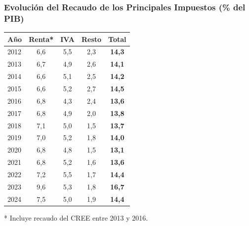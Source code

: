 
\begin{frame}[fragile]
  \frametitle{Evolución del Recaudo de los Principales Impuestos (\% del PIB)}

  \begin{table}
  \centering
  \begin{tabular}{|l|c|c|c|c|}
  \hline
  \textbf{Año} & \textbf{Renta*} & \textbf{IVA} & \textbf{Resto} & \textbf{Total} \\
  \hline
  2012 & 6,6 & 5,5 & 2,3 & \textbf{14,3} \\
  2013 & 6,7 & 4,9 & 2,6 & \textbf{14,1} \\
  2014 & 6,6 & 5,1 & 2,5 & \textbf{14,2} \\
  2015 & 6,6 & 5,2 & 2,7 & \textbf{14,5} \\
  2016 & 6,8 & 4,3 & 2,4 & \textbf{13,6} \\
  2017 & 6,8 & 4,9 & 2,0 & \textbf{13,8} \\
  2018 & 7,1 & 5,0 & 1,5 & \textbf{13,7} \\
  2019 & 7,0 & 5,2 & 1,8 & \textbf{14,0} \\
  2020 & 6,8 & 4,8 & 1,5 & \textbf{13,1} \\
  2021 & 6,8 & 5,2 & 1,6 & \textbf{13,6} \\
  2022 & 7,2 & 5,5 & 1,7 & \textbf{14,4} \\
  2023 & 9,6 & 5,3 & 1,8 & \textbf{16,7} \\
  2024 & 7,5 & 5,0 & 1,9 & \textbf{14,4} \\
  \hline
  \end{tabular}

  \par\footnotesize{* Incluye recaudo del CREE entre 2013 y 2016.}
  \end{table}

\end{frame}

